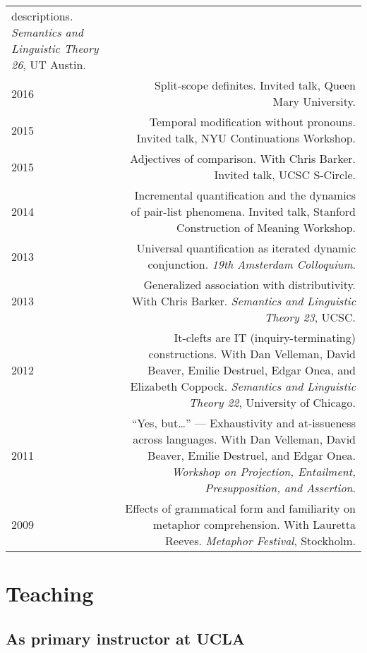 \documentclass[12pt]{article}
\begin{document}
\begin{longtable}{LR}
         descriptions.
         \textit{Semantics and Linguistic Theory 26}, UT Austin.\\
  2016 & Split-scope definites.
         Invited talk, Queen Mary University.\\
  2015 & Temporal modification without pronouns.
         Invited talk, NYU Continuations Workshop.\\
  2015 & Adjectives of comparison.
         With Chris Barker.
         Invited talk, UCSC S-Circle.\\
  2014 & Incremental quantification and the dynamics of pair-list phenomena.
         Invited talk, Stanford Construction of Meaning Workshop.\\
  2013 & Universal quantification as iterated dynamic conjunction.
         \textit{19th Amsterdam Colloquium}. \\
  2013 & Generalized association with distributivity.
         With Chris Barker.
         \textit{Semantics and Linguistic Theory 23}, UCSC.\\
  2012 & It-clefts are IT (inquiry-terminating) constructions.
         With Dan Velleman, David Beaver, Emilie Destruel, Edgar Onea, and
         Elizabeth Coppock.
         \textit{Semantics and Linguistic Theory 22}, University of Chicago.\\
  2011 & ``Yes, but\dots'' --- Exhaustivity and at-issueness across languages.
          With Dan Velleman, David Beaver, Emilie Destruel, and Edgar Onea.
          \textit{Workshop on Projection, Entailment, Presupposition, and
          Assertion}.\\
  2009 & Effects of grammatical form and familiarity on metaphor
         comprehension.
         With Lauretta Reeves.
         \textit{Metaphor Festival}, Stockholm.
\end{longtable}

\medskip

\section*{Teaching}

\subsection*{As primary instructor at UCLA}
\end{document}
